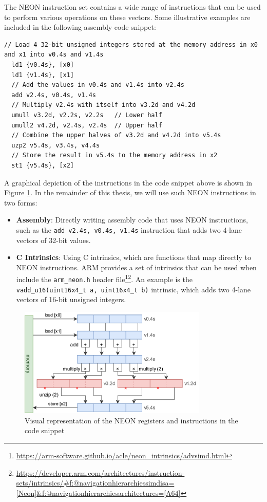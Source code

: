 \documentclass[11pt,a4paper]{report}
\theoremstyle{definition}
\begin{document}
The NEON instruction set contains a wide range of instructions that can be used to perform various operations on these vectors. Some illustrative examples are included in the following assembly code snippet:

\begin{lstlisting}[language={[x86masm]Assembler}, style=ASMStyle]
  // Load 4 32-bit unsigned integers stored at the memory address in x0 and x1 into v0.4s and v1.4s
  ld1 {v0.4s}, [x0]
  ld1 {v1.4s}, [x1]
  // Add the values in v0.4s and v1.4s into v2.4s
  add v2.4s, v0.4s, v1.4s
  // Multiply v2.4s with itself into v3.2d and v4.2d
  umull v3.2d, v2.2s, v2.2s   // Lower half
  umull2 v4.2d, v2.4s, v2.4s  // Upper half
  // Combine the upper halves of v3.2d and v4.2d into v5.4s
  uzp2 v5.4s, v3.4s, v4.4s
  // Store the result in v5.4s to the memory address in x2
  st1 {v5.4s}, [x2]
\end{lstlisting}

A graphical depiction of the instructions in the code snippet above is shown in Figure \ref{fig:neonexample}. In the remainder of this thesis, we will use such NEON instructions in two forms:
\begin{itemize}
  \item \textbf{Assembly}: Directly writing assembly code that uses NEON instructions, such as the \texttt{add v2.4s, v0.4s, v1.4s} instruction that adds two 4-lane vectors of 32-bit values.
  \item \textbf{C Intrinsics}: Using C intrinsics, which are functions that map directly to NEON instructions. ARM provides a set of intrinsics that can be used when include the \texttt{arm\_neon.h} header file\footnote{\url{https://arm-software.github.io/acle/neon\_intrinsics/advsimd.html}}\footnote{\url{https://developer.arm.com/architectures/instruction-sets/intrinsics/\#f:@navigationhierarchiessimdisa=[Neon]\&f:@navigationhierarchiesarchitectures=[A64]}}. An example is the \texttt{vadd\_u16(uint16x4\_t a, uint16x4\_t b)} intrinsic, which adds two 4-lane vectors of 16-bit unsigned integers.
\end{itemize}

\begin{figure}
  \centering
  \includegraphics[width=0.8\textwidth]{neon/neon_example.drawio.png}
  \caption{Visual representation of the NEON registers and instructions in the code snippet}
  \label{fig:neonexample}
\end{figure}
\end{document}
